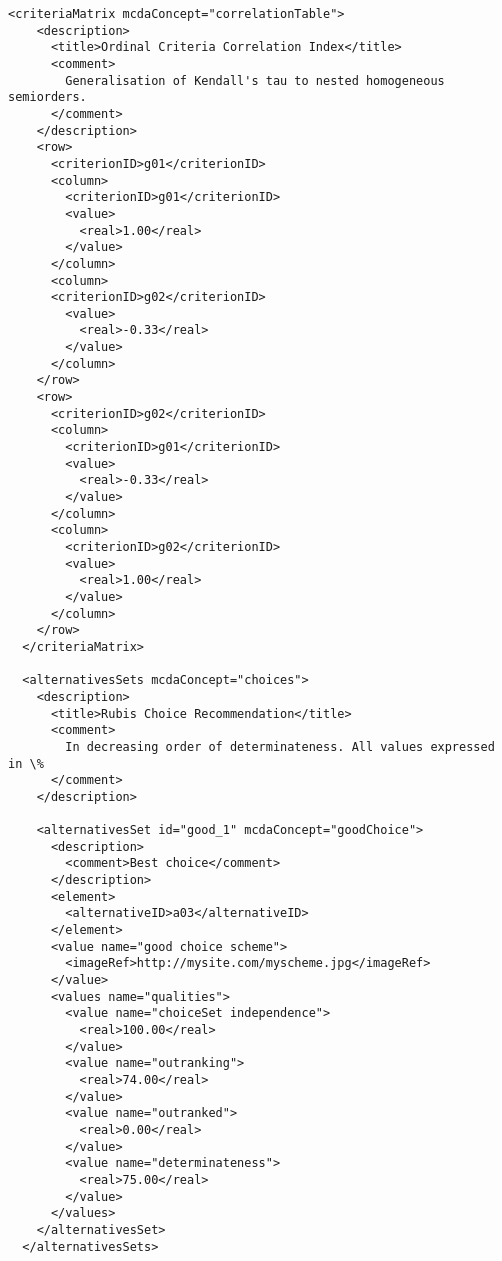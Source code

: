 \documentclass[a4paper,oneside,10 pt]{article}
\begin{document}
\begin{multicols}{2}
{\begin{lstlisting}[style=prototype, basicstyle=\tiny]
  <criteriaMatrix mcdaConcept="correlationTable">
    <description>
      <title>Ordinal Criteria Correlation Index</title>
      <comment>
        Generalisation of Kendall's tau to nested homogeneous semiorders.
      </comment>
    </description>
    <row>
      <criterionID>g01</criterionID>
      <column>
        <criterionID>g01</criterionID>
        <value>
          <real>1.00</real>
        </value>
      </column>
      <column>
      <criterionID>g02</criterionID>
        <value>
          <real>-0.33</real>
        </value>
      </column>
    </row>
    <row>
      <criterionID>g02</criterionID>
      <column>
        <criterionID>g01</criterionID>
        <value>
          <real>-0.33</real>
        </value>
      </column>
      <column>
        <criterionID>g02</criterionID>
        <value>
          <real>1.00</real>
        </value>
      </column>
    </row>
  </criteriaMatrix>
    
  <alternativesSets mcdaConcept="choices">
    <description>
      <title>Rubis Choice Recommendation</title>
      <comment>
        In decreasing order of determinateness. All values expressed in \%
      </comment>
    </description>
        
    <alternativesSet id="good_1" mcdaConcept="goodChoice">
      <description>
        <comment>Best choice</comment>
      </description>
      <element>
        <alternativeID>a03</alternativeID>
      </element>
      <value name="good choice scheme">
        <imageRef>http://mysite.com/myscheme.jpg</imageRef>
      </value>
      <values name="qualities">
        <value name="choiceSet independence">
          <real>100.00</real>
        </value>
        <value name="outranking">
          <real>74.00</real>
        </value>
        <value name="outranked">
          <real>0.00</real>
        </value>
        <value name="determinateness">
          <real>75.00</real>
        </value>
      </values>
    </alternativesSet>
  </alternativesSets>
      

\end{lstlisting}}
\end{multicols}
\end{document}

